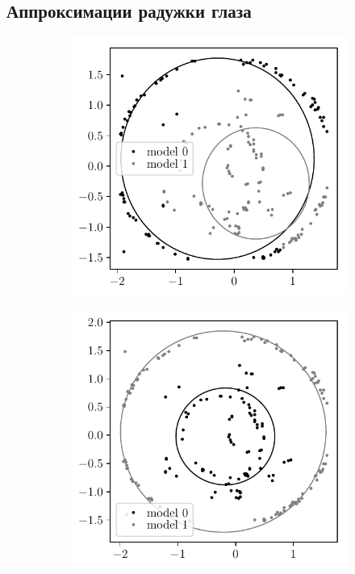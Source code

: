 \documentclass[12pt, twoside]{article}
\numberwithin{equation}{section}
\begin{document}
\subsection{Аппроксимации радужки глаза}
\begin{figure}
     \centering
     \begin{subfigure}[b]{0.3\textwidth}
         \centering
         \includegraphics[width=\textwidth]{figures/not_prior_real_example}
         \caption{}
     \end{subfigure}
     \begin{subfigure}[b]{0.3\textwidth}
         \centering
         \includegraphics[width=\textwidth]{figures/prior_real_example}

\end{subfigure}
\end{figure}
\end{document}
